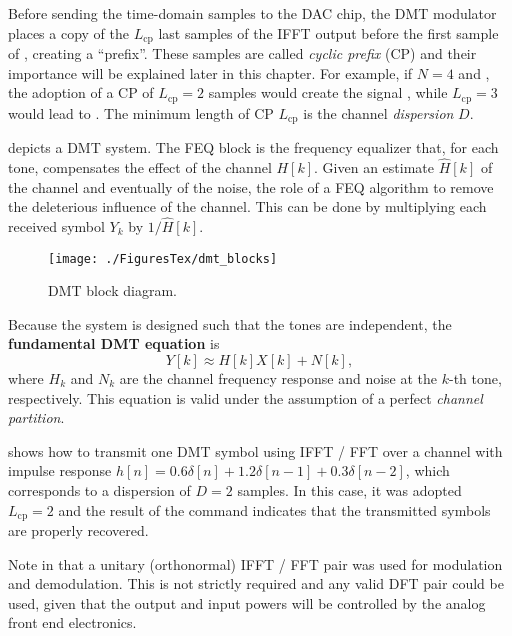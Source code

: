 Before sending the time-domain samples to the DAC chip, the DMT modulator places a copy of the $L_\textrm{cp}$ last samples of the IFFT output  before the first sample of , creating a ``prefix''. These samples are called \emph{cyclic prefix} (CP) and their importance will be explained later in this chapter. For example, if $N=4$ and , the adoption of a CP of $L_\textrm{cp}=2$ samples would create the signal \ci{[3~4~1~2~3~4]}, while $L_\textrm{cp}=3$ would lead to \ci{[2~3~4~1~2~3~4]}. The minimum length of CP $L_\textrm{cp}$ is the channel \emph{dispersion} $D$.

 depicts a DMT system. The FEQ block is the frequency equalizer that, for each tone, compensates the effect of the channel $H[k]$. Given an estimate $\hat H[k]$ of the channel and eventually
of the noise, the role of a FEQ algorithm to remove the deleterious influence of the channel. This can
be done by multiplying each received symbol $Y_k$ by $1/\hat H[k]$.

\begin{figure}
\centering
\texttt{[image: ./FiguresTex/dmt\_blocks]}
\caption{DMT block diagram.\label{fig:dmt_blocks}}
\end{figure}

Because the system is designed such that the tones are independent, the \textbf{fundamental DMT equation} is
\begin{equation}
Y[k] \approx H[k] X[k] + N[k],
\label{eq:dmt_fundamental_equation}
\end{equation}
where $H_k$ and $N_k$ are the channel frequency response and noise at the $k$-th tone, respectively.
This equation is valid under the assumption of a perfect \emph{channel partition}.%

 shows how to transmit one DMT symbol using IFFT / FFT over a channel with impulse response $h[n]=0.6 \delta[n] + 1.2 \delta[n-1] + 0.3 \delta[n-2]$, which corresponds to a dispersion of $D=2$ samples. In this case, it was adopted $L_\textrm{cp}=2$ and the result of the command  indicates that the transmitted symbols are properly recovered.


Note in  that a unitary (orthonormal) IFFT / FFT pair was used for modulation and demodulation. This is not strictly required and any valid DFT pair could be used, given that the output and input powers will be controlled by the analog front end electronics. 

